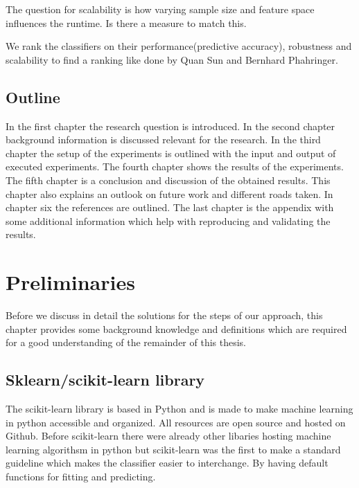 \documentclass[a4paper,10pt]{article}
\begin{document}
The question for scalability is how varying sample size and feature space influences the runtime. Is there a measure to match this. 

We rank the classifiers on their performance(predictive accuracy), robustness and scalability to find a ranking like done by Quan Sun and Bernhard Phahringer\cite{ranking}.




\subsection{Outline}
In the first chapter the research question is introduced. In the second chapter background information is discussed relevant for the research. In the third chapter the setup of the experiments is outlined with the input and output of executed experiments. The fourth chapter shows the results of the experiments. The fifth chapter is a conclusion and discussion of the obtained results. This chapter also explains an outlook on future work and different roads taken. In chapter six the references are outlined. The last chapter is the appendix with some additional information which help with reproducing and validating the results. 
\newpage


\section{Preliminaries} \label{Chapter2}
Before we discuss in detail the solutions for the steps of our approach, this chapter provides
some background knowledge and definitions which are required for a good understanding of
the remainder of this thesis.
\subsection{Sklearn/scikit-learn library}
The scikit-learn library is based in Python and is made to make machine learning in python accessible and organized. 
All resources are open source and hosted on Github. Before scikit-learn there were already other libaries hosting machine learning algorithsm in python but scikit-learn was the first to make a standard guideline which makes the classifier easier to interchange. By having default functions for fitting and predicting.
\end{document}

